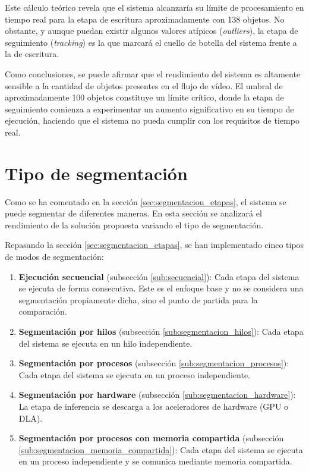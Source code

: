 \documentclass[11pt,spanish,listoffigures,listoftables]{tfgetsinf}
\begin{document}
Este cálculo teórico revela que el sistema alcanzaría su límite de procesamiento en tiempo real para la etapa de escritura aproximadamente con 138 objetos. No obstante, y aunque puedan existir algunos valores atípicos (\textit{outliers}), la etapa de seguimiento (\textit{tracking}) es la que marcará el cuello de botella del sistema frente a la de escritura.

Como conclusiones, se puede afirmar que el rendimiento del sistema es altamente sensible a la cantidad de objetos presentes en el flujo de vídeo. El umbral de aproximadamente 100 objetos constituye un límite crítico, donde la etapa de seguimiento comienza a experimentar un aumento significativo en su tiempo de ejecución, haciendo que el sistema no pueda cumplir con los requisitos de tiempo real.

\section{Tipo de segmentación} \label{sub:analisis_segmentacion}
Como se ha comentado en la sección \ref{sec:segmentacion_etapas}, el sistema se puede segmentar de diferentes maneras. En esta sección se analizará el rendimiento de la solución propuesta variando el tipo de segmentación.

Repasando la sección \ref{sec:segmentacion_etapas}, se han implementado cinco tipos de modos de segmentación:
\begin{enumerate}
   \item \textbf{Ejecución secuencial} (subsección \ref{sub:secuencial}): Cada etapa del sistema se ejecuta de forma consecutiva. Este es el enfoque base y no se considera una segmentación propiamente dicha, sino el punto de partida para la comparación.
   \item \textbf{Segmentación por hilos} (subsección \ref{sub:segmentacion_hilos}): Cada etapa del sistema se ejecuta en un hilo independiente.
   \item \textbf{Segmentación por procesos} (subsección \ref{sub:segmentacion_procesos}): Cada etapa del sistema se ejecuta en un proceso independiente.
   \item \textbf{Segmentación por hardware} (subsección \ref{sub:segmentacion_hardware}): La etapa de inferencia se descarga a los aceleradores de hardware (GPU o DLA).
   \item \textbf{Segmentación por procesos con memoria compartida} (subsección \ref{sub:segmentacion_memoria_compartida}): Cada etapa del sistema se ejecuta en un proceso independiente y se comunica mediante memoria compartida.
\end{enumerate}
\end{document}
